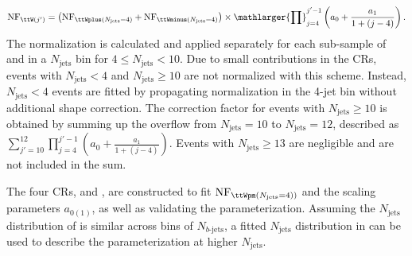\documentclass[../thesis.tex]{subfiles}
\begin{document}
\begin{equation}
\label{eq:ttWdd}
\mathrm{NF}_{\ttW(j')} = \left(\mathrm{NF}_{\ttWplus(N_\mathrm{jets}=4)} + \mathrm{NF}_{\ttWminus(N_\mathrm{jets}=4)}\right) \times \mathlarger{\prod}_{j=4}^{j'-1} \left( a_0 + \frac{a_1}{1+(j-4)} \right).
\end{equation}
The normalization is calculated and applied separately for each sub-sample of \ttWplus and \ttWminus in a $N_\mathrm{jets}$ bin for $4\leq N_\mathrm{jets}<10$. Due to small contributions in the \acs{CR}s, events with $N_\mathrm{jets}<4$ and $N_\mathrm{jets}\geq 10$ are not normalized with this scheme. Instead, $N_\mathrm{jets}<4$ events are fitted by propagating normalization in the 4-jet bin without additional shape correction. The correction factor for \ttW events with $N_\mathrm{jets}\geq 10$ is obtained by summing up the overflow from $N_\mathrm{jets}=10$ to $N_\mathrm{jets}=12$, described as $\sum_{j'=10}^{12} \prod_{j=4}^{j'-1}\left(a_0+\frac{a_1}{1+(j-4)}\right)$. Events with $N_\mathrm{jets}\geq 13$ are negligible and are not included in the sum.

The four \acs{CR}s, \CRttWpm and \CRonebpm, are constructed to fit $\mathrm{NF}_{\ttWpm(N_\mathrm{jets}=4))}$ and the scaling parameters $a_{0(1)}$, as well as validating the parameterization. Assuming the $N_\mathrm{jets}$ distribution of \ttW is similar across bins of $N_{b\text{-jets}}$, a fitted $N_\mathrm{jets}$ distribution in \CRonebpm can be used to describe the \ttW parameterization at higher $N_\mathrm{jets}$.
\end{document}
